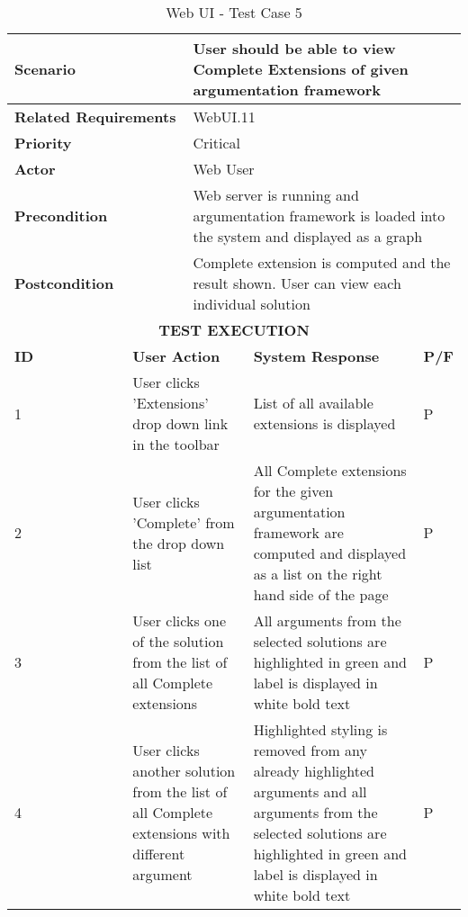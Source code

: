 \begin{longtable}[c]{p{}|p{}|p{}|p{}|p{}}
	\caption{Web UI - Test Case 5}
	\label{table:testcase5} \\
	\hline
	\multicolumn{2}{p{0.3\textwidth}}{\textbf{Scenario}} & \multicolumn{3}{p{0.7\textwidth}}{User should be able to view Complete Extensions of given argumentation framework} \\ 
	\hline
	\endfirsthead
	\endhead
	\multicolumn{2}{p{0.4\textwidth}}{\textbf{Related Requirements}} & \multicolumn{3}{p{0.6\textwidth}}{WebUI.11} \\ 
	\hline
	\multicolumn{2}{p{0.4\textwidth}}{\textbf{Priority}} & \multicolumn{3}{p{0.6\textwidth}}{Critical} \\ 
	\hline
	\multicolumn{2}{p{0.3\textwidth}}{\textbf{Actor}} & \multicolumn{3}{p{0.7\textwidth}}{Web User} \\ 
	\hline
	\multicolumn{2}{p{0.3\textwidth}}{\textbf{Precondition}} & \multicolumn{3}{p{0.7\textwidth}}{Web server is running and argumentation framework is loaded into the system and displayed as a graph} \\ 
	\hline
	\multicolumn{2}{p{0.3\textwidth}}{\textbf{Postcondition}} & \multicolumn{3}{p{0.7\textwidth}}{Complete extension is computed and the result shown. User can view each individual solution} \\ 
	\hline
	\multicolumn{5}{c}{\cellcolor{grey}\textbf{TEST EXECUTION}} \\ 
	\hline
	\textbf{ID} & \multicolumn{2}{|p{0.4\textwidth}|}{\textbf{User Action}} & \textbf{System Response} & \textbf{P/F} \\ 
	\hline
	1 & \multicolumn{2}{|p{0.4\textwidth}|}{User clicks 'Extensions' drop down link in the toolbar} & List of all available extensions is displayed & P \\ 
	\hline
	2 & \multicolumn{2}{|p{0.4\textwidth}|}{User clicks 'Complete' from the drop down list} & All Complete extensions for the given argumentation framework are computed and displayed as a list on the right hand side of the page & P \\ 
	\hline
	3 & \multicolumn{2}{|p{0.4\textwidth}|}{User clicks one of the solution from the list of all Complete extensions} & All arguments from the selected solutions are highlighted in green and label is displayed in white bold text & P \\ 
	\hline
	4 & \multicolumn{2}{|p{0.4\textwidth}|}{User clicks another solution from the list of all Complete extensions with different argument} & Highlighted styling is removed from any already highlighted arguments and all arguments from the selected solutions are highlighted in green and label is displayed in white bold text & P \\ 
	\hline
\end{longtable}

